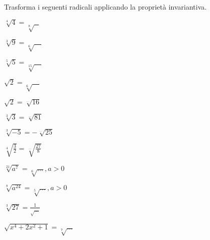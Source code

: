 \subsubsection*{}

\begin{esercizio}
 \label{ese:2.21}
Trasforma i seguenti radicali applicando la proprietà invariantiva.
 \begin{multicols}{3}
 \begin{enumeratea}
 \item $\sqrt[4]4=\sqrt[8]{\text{   }}$
 \item $\sqrt[3]9=\sqrt[6]{\quad}$
 \item $\sqrt[5]5=\sqrt[15]{\quad}$
 \item $\sqrt 2=\sqrt[6]{\quad}$
 \item $\sqrt 2=\sqrt[\dots]{16}$
 \item $\sqrt[3]3=\sqrt[\dots]{81}$
 \item $\sqrt[3]{-5}=-\sqrt[\ldots]{25}$
 \item $\sqrt[4]{\frac 3 2}=\sqrt[\ldots]{\frac{27} 8}$
 \item $\sqrt[21]{a^7}=\sqrt[6]{\ldots}, a>0$
 \item $\sqrt[8]{a^{24}}=\sqrt[5]{\ldots}, a>0$
 \item $\sqrt[3]{27}=\frac 1{\sqrt{\ldots}}$
 \item $\sqrt{x^4+2x^2+1}=\sqrt[7]{\ldots}$
 \end{enumeratea}
 \end{multicols}
\end{esercizio}


